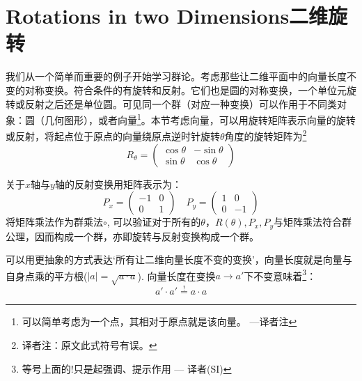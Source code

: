 \section[二维旋转]{Rotations in two Dimensions\quad 二维旋转}
\label{sec3.2}
我们从一个简单而重要的例子开始学习群论。考虑那些让二维平面中的向量长度不变的对称变换。符合条件的有旋转和反射。它们也是圆的对称变换，一个单位元旋转或反射之后还是单位圆。可见同一个群（对应一种变换）可以作用于不同类对象：圆（几何图形），或者向量\footnote{可以简单考虑为一个点，其相对于原点就是该向量。 ---译者注}。本节考虑向量，可以用旋转矩阵表示向量的旋转或反射，将起点位于原点的向量绕原点逆时针旋转$\theta$角度的旋转矩阵为\footnote{译者注：原文此式符号有误。}
\begin{equation}
\label{equ3.3}
R_\theta =
	\begin{pmatrix}
		\cos \theta & -\sin \theta \\
		\sin \theta & \cos \theta
	\end{pmatrix}
\end{equation}

关于$x$轴与$y$轴的反射变换用矩阵表示为：
\begin{equation}
\label{equ3.4}
P_x = 	\begin{pmatrix}
			-1 & 0 \\ 0 & 1
		\end{pmatrix}
\quad
P_y = 	\begin{pmatrix}
			1 & 0 \\ 0 & -1
		\end{pmatrix}
\end{equation}
将矩阵乘法作为群乘法$\circ$, 可以验证对于所有的$\theta$，$R(\theta), P_x, P_y$与矩阵乘法符合群公理，因而构成一个群，亦即旋转与反射变换构成一个群。

可以用更抽象的方式表达‘所有让二维向量长度不变的变换’，向量长度就是向量与自身点乘的平方根($|a| = \sqrt{a \cdot a}$). 向量长度在变换$a \rightarrow a'$下不变意味着\footnote{等号上面的!只是起强调、提示作用 --- 译者(SI)}：
\begin{equation}
\label{equ3.5}
a' \cdot a' \stackrel{!}{=} a \cdot a
\end{equation}

